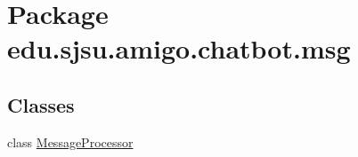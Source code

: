 \hypertarget{namespaceedu_1_1sjsu_1_1amigo_1_1chatbot_1_1msg}{}\section{Package edu.\+sjsu.\+amigo.\+chatbot.\+msg}
\label{namespaceedu_1_1sjsu_1_1amigo_1_1chatbot_1_1msg}
\subsection*{Classes}
\begin{DoxyCompactItemize}
\item 
class \hyperlink{classedu_1_1sjsu_1_1amigo_1_1chatbot_1_1msg_1_1_message_processor}{Message\+Processor}
\end{DoxyCompactItemize}
